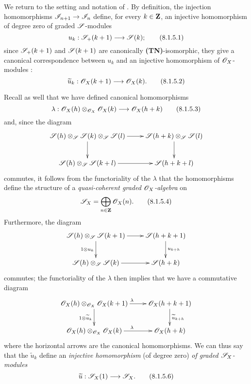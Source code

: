 \begin{env}[8.1.5]
\label{II.8.1.5}
We return to the setting and notation of .
By definition, the injection homomorphisms $\sh{I}_{n+1}\to\sh{I}_n$  define, for every $k\in\mathbf{Z}$, an injective homomorphism of degree zero of graded $\mathscr{S}$-modules
\[
\label{II.8.1.5.1}
  u_k: \sh{S}_+(k+1) \to \sh{S}(k);
\tag{8.1.5.1}
\]
since $\mathscr{S}_+(k+1)$ and $\mathscr{S}(k+1)$ are canonically \textbf{(TN)}-isomorphic, they give a canonical correspondence between $u_k$ and an injective homomorphism of $\mathscr{O}_X$-modules :
\[
\label{II.8.1.5.2}
  \widetilde{u}_k: \sh{O}_X(k+1) \to \sh{O}_X(k).
\tag{8.1.5.2}
\]

Recall as well  that we have defined canonical homomorphisms
\[
\label{II.8.1.5.3}
  \lambda: \sh{O}_X(h) \otimes_{\sh{O}_X} \sh{O}_X(k) \to \sh{O}_X(h+k)
\tag{8.1.5.3}
\]
and, since the diagram
\[
  \xymatrix{
    \sh{S}(h) \otimes_{\sh{S}} \sh{S}(k) \otimes_{\sh{S}} \sh{S}(l)
      \ar[r]
      \ar[d]
  & \sh{S}(h+k) \otimes_{\sh{S}} \sh{S}(l)
      \ar[d]
  \\\sh{S}(h) \otimes_{\sh{S}} \sh{S}(k+l)
      \ar[r]
  & \sh{S}(h+k+l)
  }
\]
commutes, it follows from the functoriality of the $\lambda$  that the homomorphisms  define the structure of a \emph{quasi-coherent graded $\mathscr{O}_X$-algebra} on
\[
\label{II.8.1.5.4}
  \mathscr{S}_X = \bigoplus_{n\in\mathbf{Z}}\mathscr{O}_X(n).
\tag{8.1.5.4}
\]
Furthermore, the diagram
\[
  \xymatrix{
    \sh{S}(h) \otimes_{\sh{S}} \sh{S}(k+1)
      \ar[r]
      \ar[d]_{1\otimes u_k}
  & \sh{S}(h+k+1)
      \ar[d]^{u_{k+h}}
  \\\sh{S}(h) \otimes_{\sh{S}} \sh{S}(k)
      \ar[r]
  & \sh{S}(h+k)
  }
\]
commutes; the functoriality of the $\lambda$ then implies that we have a commutative diagram
\[
  \xymatrix{
    \sh{O}_X(h) \otimes_{\sh{O}_X} \sh{O}_X(k+1)
      \ar[r]^{\lambda}
      \ar[d]_{1\otimes \widetilde{u}_k}
  & \sh{O}_X(h+k+1)
      \ar[d]^{\widetilde{u}_{k+h}}
  \\\sh{O}_X(h) \otimes_{\sh{O}_X} \sh{O}_X(k)
      \ar[r]^{\lambda}
  & \sh{O}_X(h+k)
  }
\]
where the horizontal arrows are the canonical homomorphisms.
We can thus say that the $\widetilde{u}_k$ define an \emph{injective homomorphism} (of degree zero) \emph{of graded $\mathscr{S}_X$-modules}
\[
\label{II.8.1.5.6}
  \widetilde{u}: \sh{S}_X(1) \to \sh{S}_X.
\tag{8.1.5.6}
\]
\end{env}

